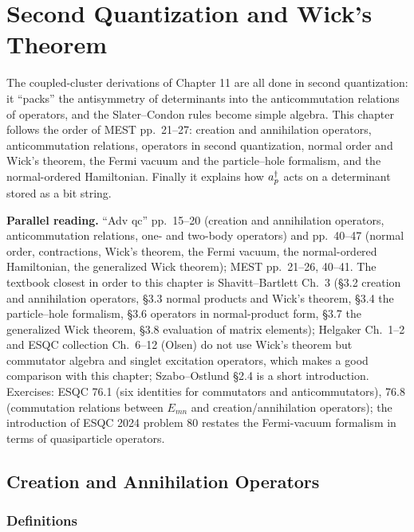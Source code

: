 \chapter{Second Quantization and Wick's Theorem}
\label{ch:sq}

The coupled-cluster derivations of Chapter 11 are all done in second quantization: it ``packs'' the antisymmetry of determinants into the anticommutation relations of operators, and the Slater--Condon rules become simple algebra. This chapter follows the order of MEST pp.~21--27: creation and annihilation operators, anticommutation relations, operators in second quantization, normal order and Wick's theorem, the Fermi vacuum and the particle--hole formalism, and the normal-ordered Hamiltonian. Finally it explains how $a^{\dagger}_{p}$ acts on a determinant stored as a bit string.

\textbf{Parallel reading.} “Adv qc” pp.~15--20 (creation and annihilation operators, anticommutation relations, one- and two-body operators) and pp.~40--47 (normal order, contractions, Wick's theorem, the Fermi vacuum, the normal-ordered Hamiltonian, the generalized Wick theorem); MEST pp.~21--26, 40--41. The textbook closest in order to this chapter is Shavitt--Bartlett Ch.~3 (§3.2 creation and annihilation operators, §3.3 normal products and Wick's theorem, §3.4 the particle--hole formalism, §3.6 operators in normal-product form, §3.7 the generalized Wick theorem, §3.8 evaluation of matrix elements); Helgaker Ch.~1--2 and ESQC collection Ch.~6--12 (Olsen) do not use Wick's theorem but commutator algebra and singlet excitation operators, which makes a good comparison with this chapter; Szabo--Ostlund §2.4 is a short introduction. Exercises: ESQC 76.1 (six identities for commutators and anticommutators), 76.8 (commutation relations between $E_{mn}$ and creation/annihilation operators); the introduction of ESQC 2024 problem 80 restates the Fermi-vacuum formalism in terms of quasiparticle operators.

\section{Creation and Annihilation Operators}

\subsection{Definitions}

